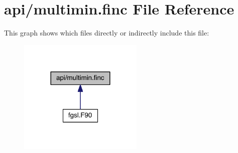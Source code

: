 \hypertarget{multimin_8finc}{\section{api/multimin.finc File Reference}
\label{multimin_8finc}
}
This graph shows which files directly or indirectly include this file\-:\nopagebreak
\begin{figure}[H]
\begin{center}
\leavevmode
\includegraphics[width=168pt]{multimin_8finc__dep__incl}
\end{center}
\end{figure}
